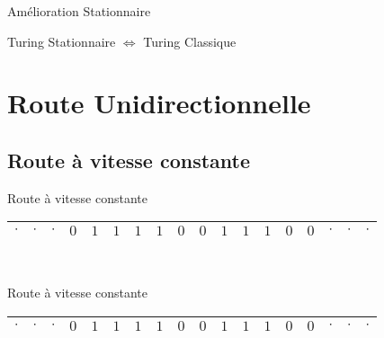 \documentclass[12pt]{beamer}
\begin{document}
\begin{frame}{Amélioration Stationnaire}
\begin{center}
    \begin{tcolorbox}[colframe=red, hbox]
    \large Turing Stationnaire $\Longleftrightarrow$ Turing Classique
\end{tcolorbox}
\end{center}

\end{frame}






\section{Route Unidirectionnelle}
\subsection{Route à vitesse constante}
\begin{frame}{Route à vitesse constante}
\begin{center}
    \begin{tabular}{|c|c|c|c|c|c|c|c|c|c|c|c|c|c|c|c|c|c|}\hline
     $\cdot$ & $\cdot$ & $\cdot$ & $0$ & $1$ & $1$ & $1$ & $1$ & $0$ & $0$ & $1$ & $1$ & $1$ & $0$ & $0$ & $\cdot$ & $\cdot$ & $\cdot$ \\\hline
     
\end{tabular}\\
\end{center}
\end{frame}

\begin{frame}{Route à vitesse constante}
\addtocounter{framenumber}{-1}
\begin{center}
    \begin{tabular}{|c|c|c|c|c|c|c|c|c|c|c|c|c|c|c|c|c|c|}\hline
     $\cdot$ & $\cdot$ & $\cdot$ & $0$ & $1$ & $1$ & $1$ & $1$ & $0$ & $0$ & $1$ & $1$ & $1$ & $0$ & $0$ & $\cdot$ & $\cdot$ & $\cdot$ \\\hline
     
\end{tabular}\\
\end{center}
\end{frame}
\end{document}
